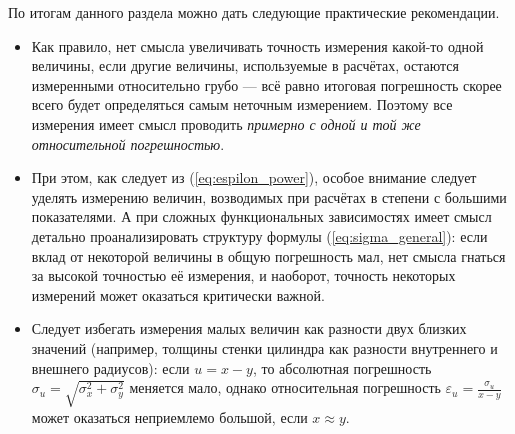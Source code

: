 По итогам данного раздела можно дать следующие практические рекомендации.
\begin{itemize}
\item Как правило, нет смысла увеличивать точность измерения какой-то одной
величины, если другие величины, используемые в расчётах, остаются
измеренными относительно грубо --- всё равно итоговая погрешность
скорее всего будет определяться самым неточным измерением. Поэтому
все измерения имеет смысл проводить \emph{примерно с одной и той же
относительной погрешностью}. 
\item При этом, как следует из (\ref{eq:espilon_power}), особое внимание
следует уделять измерению величин, возводимых при расчётах в степени
с большими показателями. А при сложных функциональных зависимостях
имеет смысл детально проанализировать структуру формулы (\ref{eq:sigma_general}):
если вклад от некоторой величины в общую погрешность мал, нет смысла
гнаться за высокой точностью её измерения, и наоборот, точность некоторых
измерений может оказаться критически важной.
\item Следует избегать измерения малых величин как разности двух близких
значений (например, толщины стенки цилиндра как разности внутреннего
и внешнего радиусов): если $u=x-y$, то абсолютная погрешность $\sigma_{u}=\sqrt{\sigma_{x}^{2}+\sigma_{y}^{2}}$
меняется мало, однако относительная погрешность $\varepsilon_{u}=\frac{\sigma_{u}}{x-y}$
может оказаться неприемлемо большой, если $x\approx y$.
\end{itemize}